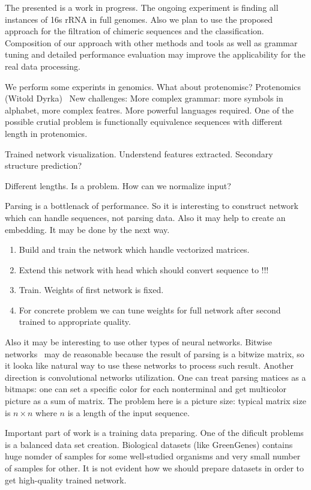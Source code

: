 \documentclass[a4paper,twoside]{article}
\begin{document}
\noindent The presented is a work in progress. 
The ongoing experiment is finding all instances of 16s rRNA in full genomes.
Also we plan to use the proposed approach for the filtration of chimeric sequences and the classification.
Composition of our approach with other methods and tools as well as grammar tuning and detailed performance evaluation may improve the applicability for the real data processing.

We perform some experints in genomics. 
What about protenomisc?
Protenomics (Witold Dyrka)~\cite{DBLP:Witold:Proteins}
New challenges: More complex grammar: more symbols in alphabet, more complex featres.
More powerful languages required.
One of the possible crutial problem is functionally equivalence sequences with different length in protenomics.

Trained network visualization.
Understend features extracted.
Secondary structure prediction?

Different lengths. Is a problem.
How can we normalize input?

Parsing is a bottlenack of performance.
So it is interesting to construct network which can handle sequences, not parsing data.
Also it may help to create an embedding.
It may be done by the next way.
\begin{enumerate}
\item Build and train the network which handle vectorized matrices.
\item Extend this network with head which should convert sequence to !!!
\item Train. Weights of first network is fixed.
\item For concrete problem we can tune weights for full network after second trained to appropriate quality.
\end{enumerate}

Also it may be interesting to use other types of neural networks.
Bitwise networks~\cite{DBLP:journals:corr:KimS16} may de reasonable because the result of parsing is a bitwize matrix, so it looka like natural way to use these networks to process such result. 
Another direction is convolutional networks utilization.
One can treat parsing matices as a bitmaps: one can set a specific color for each nonterminal and get multicolor picture as a sum of matrix.
The problem here is a picture size: typical matrix size is $n \times n$ where $n$ is a length of the input sequence.

Important part of work is a training data preparing.
One of the dificult problems is a balanced data set creation.
Biological datasets (like GreenGenes) contains huge nomder of samples for some well-studied organisms and very small number of samples for other.
It is not evident how  we should prepare datasets in order to get high-quality trained network.
\end{document}
